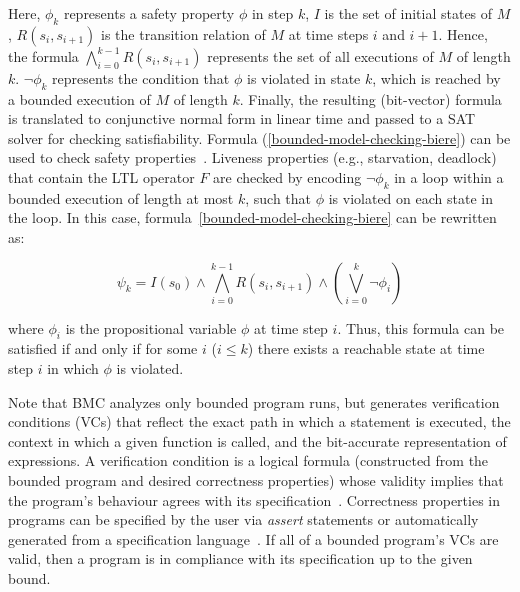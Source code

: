 \documentclass[format=acmsmall, review=false, screen=true]{acmart}
\begin{document}
\noindent Here, $\phi_{k}$ represents a safety property $\phi$ in step $k$, $I$ is the set of initial states of $M$, $R\left(s_{i},s_{i+1}\right)$ is the transition relation of $M$ at time steps $i$ and $i+1$. Hence, the formula $\bigwedge^{k-1}_{i=0} R\left(s_{i},s_{i+1}\right)$ represents the set of all executions of $M$ of length $k$. $\neg \phi_{k}$ represents the condition that $\phi$ is violated in state $k$, which is reached by a bounded execution of $M$ of length $k$. Finally, the resulting (bit-vector) formula is translated to conjunctive normal form in linear time and passed to a SAT solver for checking satisfiability. Formula (\ref{bounded-model-checking-biere}) can be used to check safety properties~\cite{PrasadBG05}. Liveness properties (e.g., starvation, deadlock) that contain the LTL operator $F$ are checked by encoding $\neg \phi_{k}$ in a loop within a bounded execution of length at most $k$, such that $\phi$ is violated on each state in the loop. In this case, formula~\ref{bounded-model-checking-biere} can be rewritten as:

%
\begin{equation}
\psi_{k} = I\left(s_{0}\right) \wedge \bigwedge^{k-1}_{i=0} R\left(s_{i},s_{i+1}\right) \wedge \left(\bigvee^{k}_{i=0} \neg \phi_{i}\right)
\end{equation}

\noindent where $\phi_{i}$ is the propositional variable $\phi$ at time step $i$. Thus, this formula can be satisfied if and only if for some $i$ ($i \leq k$) there exists a reachable state at time step $i$ in which $\phi$ is violated. 

Note that BMC analyzes only bounded program runs, but generates verification conditions (VCs) that reflect the exact path in which a statement is executed, the context in which a given function is called, and the bit-accurate representation of expressions. A verification condition is a logical formula (constructed from the bounded program and desired correctness properties) whose validity implies that the program's behaviour agrees with its specification~\cite{Bradley07}. Correctness properties in programs can be specified by the user via \textit{assert} statements or automatically generated from a specification language~\cite{Thomas01}. If all of a bounded program's VCs are valid, then a program is in compliance with its specification up to the given bound.
\end{document}
